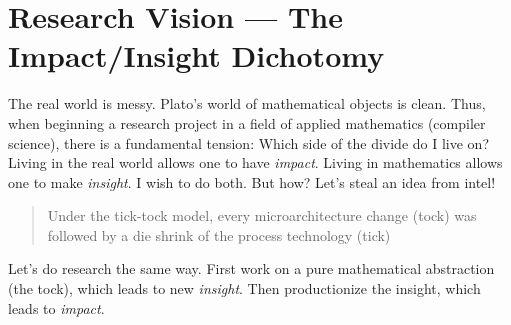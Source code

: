 \documentclass{article}
\begin{document}
\section{Research Vision --- The Impact/Insight Dichotomy}

The real world is messy. Plato's world of mathematical objects is clean.
Thus, when beginning a research project in a field of applied mathematics
(compiler science), there is a fundamental tension: Which side of the divide
do I live on? Living in the real world allows one to have \emph{impact}. Living
in mathematics allows one to make \emph{insight}. I wish to do both.
But how? Let's steal an idea from intel!

\begin{quote}
Under the tick-tock model, every microarchitecture change (tock) was followed by a die
shrink of the process technology (tick)
\end{quote}

Let's do research the same way. First work on a pure mathematical abstraction
(the tock), which leads to new \emph{insight}. Then productionize the insight,
which leads to \emph{impact}.
\end{document}
